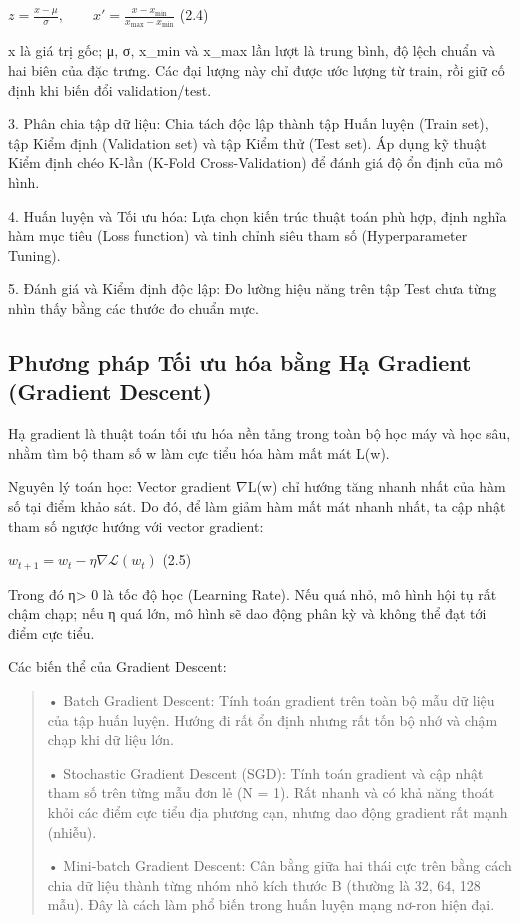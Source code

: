 \(z = \frac{x - \mu}{\sigma},\quad\quad x' = \frac{x - x_{\min}}{x_{\max} - x_{\min}}\)
(2.4)

x là giá trị gốc; μ, σ, x\_min và x\_max lần lượt là trung bình, độ lệch
chuẩn và hai biên của đặc trưng. Các đại lượng này chỉ được ước lượng từ
train, rồi giữ cố định khi biến đổi validation/test.

3. Phân chia tập dữ liệu: Chia tách độc lập thành tập Huấn luyện (Train
set), tập Kiểm định (Validation set) và tập Kiểm thử (Test set). Áp dụng
kỹ thuật Kiểm định chéo K-lần (K-Fold Cross-Validation) để đánh giá độ
ổn định của mô hình.

4. Huấn luyện và Tối ưu hóa: Lựa chọn kiến trúc thuật toán phù hợp, định
nghĩa hàm mục tiêu (Loss function) và tinh chỉnh siêu tham số
(Hyperparameter Tuning).

5. Đánh giá và Kiểm định độc lập: Đo lường hiệu năng trên tập Test chưa
từng nhìn thấy bằng các thước đo chuẩn mực.

\subsection{Phương pháp Tối ưu hóa bằng Hạ Gradient (Gradient Descent)}\label{phux1b0ux1a1ng-phuxe1p-tux1ed1i-ux1b0u-huxf3a-bux1eb1ng-hux1ea1-gradient-gradient-descent}

Hạ gradient là thuật toán tối ưu hóa nền tảng trong toàn bộ học máy và
học sâu, nhằm tìm bộ tham số w làm cực tiểu hóa hàm mất mát L(w).

Nguyên lý toán học: Vector gradient \ensuremath{\nabla}L(w) chỉ hướng tăng nhanh nhất của
hàm số tại điểm khảo sát. Do đó, để làm giảm hàm mất mát nhanh nhất, ta
cập nhật tham số ngược hướng với vector gradient:

\(w_{t + 1} = w_{t} - \eta\nabla\mathcal{L}(w_{t})\) (2.5)

Trong đó η\textgreater{} 0 là tốc độ học (Learning Rate). Nếu quá nhỏ,
mô hình hội tụ rất chậm chạp; nếu η quá lớn, mô hình sẽ dao động phân kỳ
và không thể đạt tới điểm cực tiểu.

Các biến thể của Gradient Descent:

\begin{quote}
• Batch Gradient Descent: Tính toán gradient trên toàn bộ mẫu dữ liệu
của tập huấn luyện. Hướng đi rất ổn định nhưng rất tốn bộ nhớ và chậm
chạp khi dữ liệu lớn.

• Stochastic Gradient Descent (SGD): Tính toán gradient và cập nhật tham
số trên từng mẫu đơn lẻ (N = 1). Rất nhanh và có khả năng thoát khỏi các
điểm cực tiểu địa phương cạn, nhưng dao động gradient rất mạnh (nhiễu).

• Mini-batch Gradient Descent: Cân bằng giữa hai thái cực trên bằng cách
chia dữ liệu thành từng nhóm nhỏ kích thước B (thường là 32, 64, 128
mẫu). Đây là cách làm phổ biến trong huấn luyện mạng nơ-ron hiện đại.
\end{quote}

